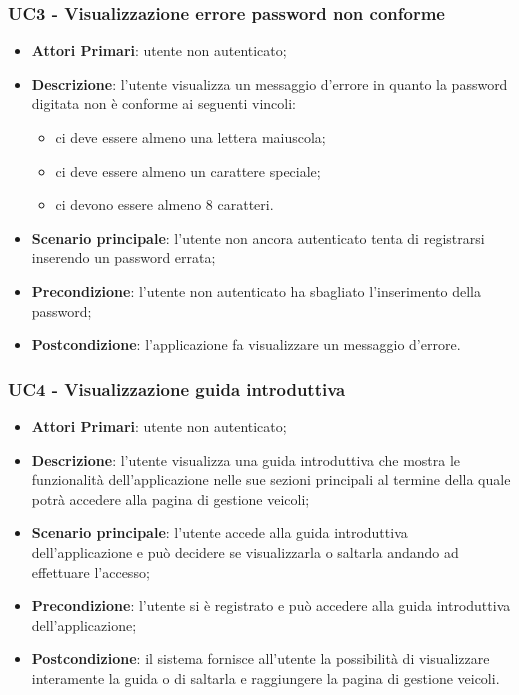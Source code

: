 \subsubsection{UC3 - Visualizzazione errore password non conforme}
\begin{itemize}
	\item \textbf{Attori Primari}: utente non autenticato;
	\item \textbf{Descrizione}: l'utente visualizza un messaggio d'errore in quanto la password digitata non è conforme ai seguenti vincoli:
		\begin{itemize}
			\item ci deve essere almeno una lettera maiuscola;
			\item ci deve essere almeno un carattere speciale;
			\item ci devono essere almeno 8 caratteri.
		\end{itemize}
	\item \textbf{Scenario principale}: l'utente non ancora autenticato tenta di registrarsi inserendo un password errata;
	\item \textbf{Precondizione}: l'utente non autenticato ha sbagliato l'inserimento della password; 
	\item \textbf{Postcondizione}: l'applicazione fa visualizzare un messaggio d'errore.
\end{itemize}

\subsubsection{UC4 - Visualizzazione guida introduttiva}
\begin{itemize}
	\item \textbf{Attori Primari}: utente non autenticato;
	\item \textbf{Descrizione}: l'utente visualizza una guida introduttiva che mostra le funzionalità dell'applicazione nelle sue sezioni principali al termine della quale potrà accedere alla pagina di gestione veicoli;
	\item \textbf{Scenario principale}: l'utente accede alla guida introduttiva dell'applicazione e può decidere se visualizzarla o saltarla andando ad effettuare l'accesso;
	\item \textbf{Precondizione}: l'utente si è registrato e può accedere alla guida introduttiva dell'applicazione;
	\item \textbf{Postcondizione}: il sistema fornisce all'utente la possibilità di visualizzare interamente la guida o di saltarla e raggiungere la pagina di gestione veicoli.
\end{itemize}

